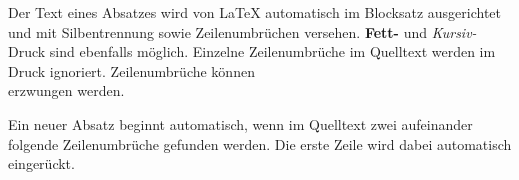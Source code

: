 Der Text eines Absatzes wird von LaTeX automatisch im
Blocksatz ausgerichtet und mit Silbentrennung sowie
Zeilenumbrüchen versehen. \textbf{Fett-} und
\textit{Kursiv-}Druck sind ebenfalls möglich.
Einzelne Zeilenumbrüche im Quelltext werden im Druck ignoriert.
Zeilenumbrüche können\\
erzwungen \newline
werden.

Ein neuer Absatz beginnt automatisch, wenn im Quelltext zwei
aufeinander folgende Zeilenumbrüche gefunden werden. Die erste
Zeile wird dabei automatisch eingerückt.
